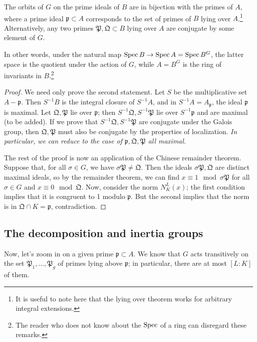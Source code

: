 \begin{proposition} The orbits of $G$ on the prime ideals of $B$ are in bijection with the primes of $A$, where a prime ideal $\mathfrak{p} \subset A$ corresponds to the set of primes of $B$ lying over $A$.\footnote{It is useful to note here that the lying over theorem works for arbitrary integral extensions.}  Alternatively, any two primes $\mathfrak{P}, \mathfrak{Q} \subset B$ lying over $A$ are conjugate by some element of $G$.
\end{proposition}

In other words, under the natural map $\operatorname{Spec} B \to \operatorname{Spec} A =\operatorname{Spec} B^G$, the latter space is the quotient under the action of $G$, while $A=B^G$ is the ring of invariants in $B$.\footnote{The reader who does not know about the $\operatorname{Spec}$ of a ring can disregard these remarks.}

\begin{proof} 
We need only prove the second statement. 
Let $S$ be the multiplicative set $A - \mathfrak{p}$.  Then $S^{-1}B $ is the integral closure of $S^{-1}A$, and in $S^{-1}A = A_{\mathfrak{p}}$, the ideal $\mathfrak{p}$ is maximal. 
Let $\mathfrak{Q}, \mathfrak{P}$ lie over $\mathfrak{p}$; then $S^{-1}\mathfrak{Q},S^{-1} \mathfrak{P}$  lie over $S^{-1}\mathfrak{p}$ and are maximal (to be added).  If we prove that $S^{-1} \mathfrak{Q}, S^{-1} \mathfrak{P}$ are conjugate under the Galois group, then $\mathfrak{Q}, \mathfrak{P}$ must also be conjugate by the properties of localization.  \emph{In particular, we can reduce to the case of $\mathfrak{p}, \mathfrak{Q}, \mathfrak{P}$ all maximal.}

The rest of the proof is now an application of the Chinese remainder theorem.  Suppose that, for all $\sigma \in G$, we have $\sigma \mathfrak{P} \neq \mathfrak{Q}$.  Then the ideals $\sigma \mathfrak{P}, \mathfrak{Q}$ are distinct maximal ideals, so by the remainder theorem, we can find $x \equiv 1 \mod \sigma \mathfrak{P}$ for all $\sigma \in G$ and $x \equiv  0 \mod \mathfrak{Q}$.
Now, consider the norm $N^L_K(x)$; the first condition implies that it is congruent to 1 modulo $\mathfrak{p}$.  But the second implies that  the norm is in $\mathfrak{Q} \cap K = \mathfrak{p}$, contradiction.
\end{proof}

\subsection{The decomposition and inertia groups}
Now, let's zoom in on a given prime $\mathfrak{p} \subset A$.  We know that $G$ acts transitively on the set $\mathfrak{P}_1, \dots, \mathfrak{P}_g$ of primes lying above $\mathfrak{p}$; in particular, there are at most $[L:K]$ of them.  

